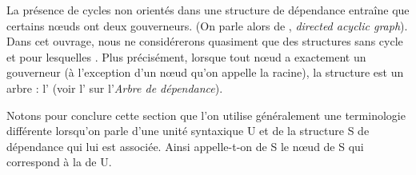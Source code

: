 La présence de cycles non orientés dans une structure de dépendance entraîne que certains nœuds ont deux gouverneurs. (On parle alors de , \textit{directed acyclic graph}). Dans cet ouvrage, nous ne considérerons quasiment que des structures sans cycle et pour lesquelles  . Plus précisément, lorsque tout nœud a exactement un gouverneur (à l’exception d’un nœud qu’on appelle la racine), la structure est un arbre : l’ (voir l' sur l'\textit{Arbre de dépendance}).

Notons pour conclure cette section que l’on utilise généralement une terminologie différente lorsqu’on parle d’une unité syntaxique U et de la structure S de dépendance qui lui est associée. Ainsi appelle-t-on  de S le nœud de S qui correspond à la  de U.

